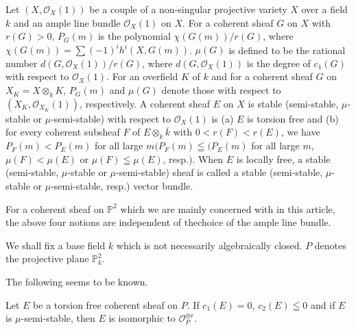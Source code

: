 \begin{dfn}\label{dfn1.1}
Let $(X,\mathscr{O}_X(1))$ be a couple of a non-singular projective
variety $X$ over a field $k$ and an ample line bundle
$\mathscr{O}_X(1)$ on $X$. For a coherent sheaf $G$ on $X$ with
$r(G)>0$, $P_G(m)$ is the polynomial
$\chi (G(m))/r(G)$, where
$\chi (G(m))=\sum(-1)^{i}h^{i}(X, G(m))$. $\mu(G)$ is defined to
be the rational number $d(G,\mathscr{O}_X(1))/r(G)$, where
$d(G,\mathscr{O}_X(1))$ is the degree of $c_1(G)$ with respect to
$\mathscr{O}_X(1)$. For an overfield $K$ of $k$ and for a coherent
sheaf $G$ on $X_K=X\otimes_{k}K$, $P_G(m)$ and $\mu(G)$ denote those
with respect to $(X_K, \mathscr{O}_{X_K}(1))$, respectively. A
coherent sheaf $E$ on $X$ is stable (semi-stable, $\mu$-stable or
$\mu$-semi-stable) with respect to $\mathscr{O}_X(1)$ is (a) $E$ is
torsion free and (b) for every coherent subsheaf $F$ of $E\otimes_k
\overline{k}$ with $0<r(F)<r(E)$, we have $P_F(m)<P_E(m)$ for all
large $m(P_F(m)\leqq(P_E(m)$ for all large $m$, $\mu(F)<\mu(E)$ or
$\mu(F)\leqq\mu(E)$, resp.). When $E$ is locally free, a stable
(semi-stable, $\mu$-stable or $\mu$-semi-stable) sheaf is called a
stable (semi-stable, $\mu$-stable or $\mu$-semi-stable, resp.) vector
bundle. 
\end{dfn}

For a coherent sheaf on $\mathbb{P}^{2}$ which we are mainly concerned
with in this article, the above four notions are independent 
of the\pageoriginale choice of the ample line bundle.

\begin{notation}\label{notation1.2}
We shall fix a base field $k$ which is not necessarily algebraically
closed. $P$ denotes the projective plane $\mathbb{P}^{2}_k$. 

The following seems to be known.
\end{notation}

\begin{lemma}\label{lemma1.3}
Let $E$ be a torsion free coherent sheaf on $P$. If $c_1(E)=0$,
$c_2(E)\leqq 0$ and if $E$ is $\mu$-semi-stable, then $E$ is
isomorphic to $\mathscr{O}^{\oplus r}_P$.
\end{lemma}


